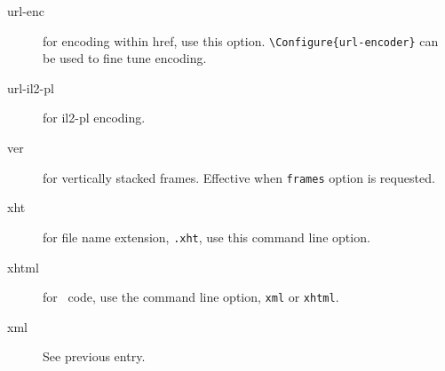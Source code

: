 \begin{description}

\item[url-enc] for \space encoding within href, use this
  option.  \verb=\Configure{url-encoder}= can be used to fine tune
  encoding.

\item[url-il2-pl] for il2-pl  encoding.

\item[ver] for vertically stacked frames. Effective when \verb=frames=
  option is requested.


\item[xht] for file name extension, \verb=.xht=, use this command line
  option.

\item[xhtml] for \xml\ code, use the command line option, \verb=xml= or
  \verb=xhtml=.

\item[xml] See previous entry.


\end{description}
\endgroup

